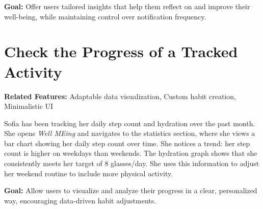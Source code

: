 \vspace{0.2cm}
\noindent
\textbf{Goal:} Offer users tailored insights that help them reflect on and improve their well-being, while maintaining control over notification frequency.

\section{Check the Progress of a Tracked Activity}

\textbf{Related Features:} Adaptable data visualization, Custom habit creation, Minimalistic UI

\vspace{0.3cm}
\noindent
Sofia has been tracking her daily step count and hydration over the past month. She opens \textit{Well MEing} and navigates to the statistics section, where she views a bar chart showing her daily step count over time. She notices a trend: her step count is higher on weekdays than weekends. The hydration graph shows that she consistently meets her target of 8 glasses/day. She uses this information to adjust her weekend routine to include more physical activity.

\vspace{0.2cm}
\noindent
\textbf{Goal:} Allow users to visualize and analyze their progress in a clear, personalized way, encouraging data-driven habit adjustments.
